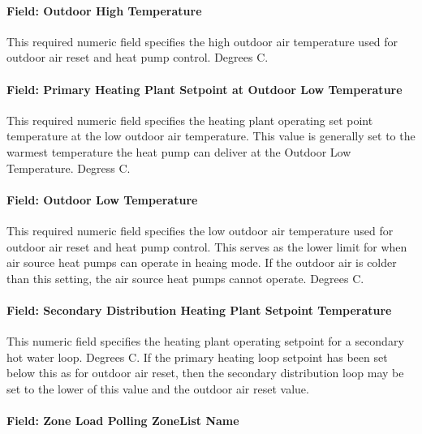 \paragraph{Field: Outdoor High Temperature}\label{field-hot-water-high-outdoor-air-temp-plantequipmentoperationchillerheaterchangeover}

This required numeric field specifies the high outdoor air temperature used for outdoor air reset and heat pump control.  Degrees C.

\paragraph{Field: Primary Heating Plant Setpoint at Outdoor Low Temperature}\label{field-hot-water-setpoint-reset-max-temp-diff-plantequipmentoperationchillerheaterchangeover}

This required numeric field specifies the heating plant operating set point temperature at the low outdoor air temperature. This value is generally set to the warmest temperature the heat pump can deliver at the Outdoor Low Temperature.  Degress C.

\paragraph{Field: Outdoor Low Temperature}\label{field-hot-water-setpoint-reset-ratio-plantequipmentoperationchillerheaterchangeover}

This required numeric field specifies the low outdoor air temperature used for outdoor air reset and heat pump control.  This serves as the lower limit for when air source heat pumps can operate in heaing mode.  If the outdoor air is colder than this setting, the air source heat pumps cannot operate.  Degrees C.

\paragraph{Field: Secondary Distribution Heating Plant Setpoint Temperature}\label{secondary-distribution-heating-plant-setpoint-temperature}

This numeric field specifies the heating plant operating setpoint for a secondary hot water loop.  Degrees C.  If the primary heating loop setpoint has been set below this as for outdoor air reset, then the secondary distribution loop may be set to the lower of this value and the outdoor air reset value. 

\paragraph{Field: Zone Load Polling ZoneList Name}\label{field-zone-load-polling-zonelist-name-plantequipmentoperationchillerheaterchangeover}


